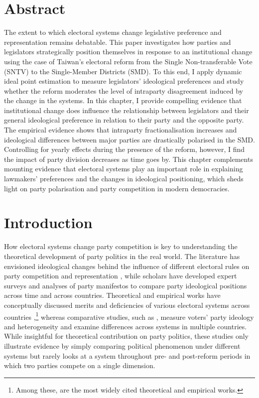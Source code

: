 
\section*{\centering Abstract}
\small The extent to which electoral systems change legislative preference and representation remains debatable. This paper investigates how parties and legislators strategically position themselves in response to an institutional change using the case of Taiwan's electoral reform from the Single Non-transferable Vote (SNTV) to the Single-Member Districts (SMD). To this end, I apply dynamic ideal point estimation to measure legislators' ideological preferences and study whether the reform moderates the level of intraparty disagreement induced by the change in the systems. In this chapter, I provide compelling evidence that institutional change does influence the relationship between legislators and their general ideological preference in relation to their party and the opposite party. The empirical evidence shows that intraparty fractionalisation increases and ideological differences between major parties are drastically polarised in the SMD. Controlling for yearly effects during the presence of the reform, however, I find the impact of party division decreases as time goes by. This chapter complements mounting evidence that electoral systems play an important role in explaining lawmakers' preferences and the changes in ideological positioning, which sheds light on party polarisation and party competition in modern democracies. %

\clearpage

\section*{\centering Introduction}
How electoral systems change party competition is key to understanding the theoretical development of party politics in the real world. The literature has envisioned ideological changes behind the influence of different electoral rules on party competition and representation \citep[e.g.][]{Curini2012, Dow2011, Ezrow2008}, while scholars have developed expert surveys \citep[][]{Bakker2014a, Benoit2006, Huber1995} and analyses of party manifestos \citep[][]{Budge2001, Budge1994, Huber1995, Volkens2013} to compare party ideological positions across time and across countries. Theoretical and empirical works have conceptually discussed merits and deficiencies of various electoral systems across countries \citep[e.g.][]{Andre2014, Cox2008, Shugart2003,  Burnham2005},\footnote{Among these, \citet{Cain1987, Grofman1999, Shugart2003, Ware2009, Colomer2011} are the most widely cited theoretical and empirical works.} whereas comparative studies, such as \citet{Carroll2019, Dow2011, Ezrow2008}, measure voters' party ideology and heterogeneity and examine differences across systems in multiple countries. While insightful for theoretical contribution on party politics, these studies only illustrate evidence by simply comparing political phenomenon under different systems but rarely looks at a system throughout pre- and post-reform periods in which two parties compete on a single dimension.

